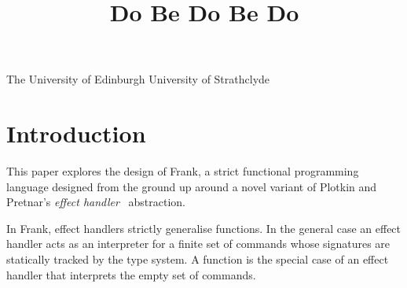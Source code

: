 \documentclass[preprint]{sigplanconf}
\begin{document}


\title{Do Be Do Be Do}

           {The University of Edinburgh}
           {}
           {University of Strathclyde}
           {}

\maketitle



\section{Introduction}

This paper explores the design of Frank, a strict functional
programming language designed from the ground up around a novel
variant of Plotkin and Pretnar's \emph{effect
  handler}~\cite{PlotkinP09, PlotkinP13} abstraction.

In Frank, effect handlers strictly generalise functions. In the
general case an effect handler acts as an interpreter for a finite set
of commands whose signatures are statically tracked by the type
system. A function is the special case of an effect handler that
interprets the empty set of commands.
\end{document}
